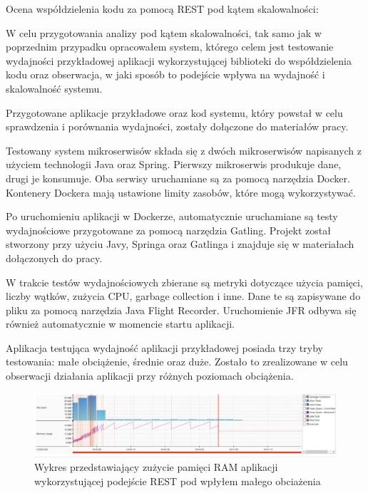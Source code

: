 \documentclass[runningheads,12pt]{llncs}
\begin{document}
Ocena współdzielenia kodu za pomocą REST pod kątem skalowalności:

W celu przygotowania analizy pod kątem skalowalności, tak samo jak w poprzednim przypadku opracowałem system, którego celem jest testowanie wydajności przykładowej aplikacji wykorzystującej biblioteki do współdzielenia kodu oraz obserwacja, w jaki sposób to podejście wpływa na wydajność i skalowalność systemu.

Przygotowane aplikacje przykładowe oraz kod systemu, który powstał w celu sprawdzenia i porównania wydajności, zostały dołączone do materiałów pracy.

Testowany system mikroserwisów składa się z dwóch mikroserwisów napisanych z użyciem technologii Java oraz Spring. Pierwszy mikroserwis produkuje dane, drugi je konsumuje. Oba serwisy uruchamiane są za pomocą narzędzia Docker. Kontenery Dockera mają ustawione limity zasobów, które mogą wykorzystywać.

Po uruchomieniu aplikacji w Dockerze, automatycznie uruchamiane są testy wydajnościowe przygotowane za pomocą narzędzia Gatling. Projekt został stworzony przy użyciu Javy, Springa oraz Gatlinga i znajduje się w materiałach dołączonych do pracy.

W trakcie testów wydajnościowych zbierane są metryki dotyczące użycia pamięci, liczby wątków, zużycia CPU, garbage collection i inne. Dane te są zapisywane do pliku za pomocą narzędzia Java Flight Recorder. Uruchomienie JFR odbywa się również automatycznie w momencie startu aplikacji.

Aplikacja testująca wydajność aplikacji przykładowej posiada trzy tryby testowania: małe obciążenie, średnie oraz duże. Zostało to zrealizowane w celu obserwacji działania aplikacji przy różnych poziomach obciążenia.

\newpage


\begin{figure}
    \includegraphics[width=\linewidth]{images/rest-memory-low-graph.jpg}
    \caption{Wykres przedstawiający zużycie pamięci RAM aplikacji wykorzystującej podejście REST pod wpłyłem małego obciażenia} \label{fig1}
\end{figure}
\end{document}
